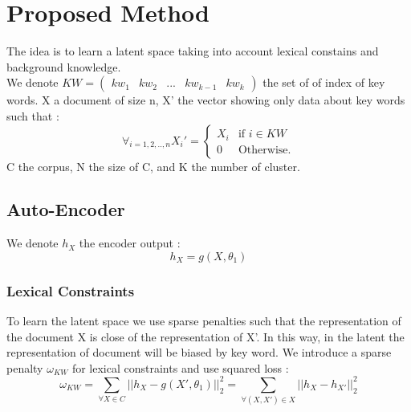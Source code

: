 \section{Proposed Method}
The idea is to learn a latent space taking into account lexical constains and
background knowledge.
\\We denote $KW = \begin{pmatrix} kw_1 & kw_2 & ... & kw_{k-1} & kw_{k}
\end {pmatrix}$
the set of of index of key words. X a document of size n,
X' the vector showing only data about key words such that :
\begin{equation*}
\forall_{i=1,2,..,n}X_i' = \left\{
\begin{array}{ll}
  X_i & \mbox{if } i \in KW \\
  0 & \mbox{Otherwise.}
\end{array}
\right.
\end{equation*}
C the corpus, N the size of C, and K the number of cluster.
\subsection{Auto-Encoder}
We denote $h_X$ the encoder output : 
\begin{equation}\label{eq:h}
  h_X = g(X,\theta_1)
\end{equation}
\subsubsection{Lexical Constraints}
To learn the latent space we use sparse penalties such that the representation
of the document X is close of the representation of X'. In this way, in the
latent the representation of document will be biased by key word. We introduce a
sparse penalty $\omega_{KW}$ for lexical constraints and use squared loss : 
\begin{equation}\label{eq:omega1}
  \omega_{KW} = \sum_{\forall{X\in C}} || h_X - g(X',\theta_1) ||_2^2 =
  \sum_{\forall{(X,X')\in X}} || h_X - h_{X'}||_2^2
\end{equation}
